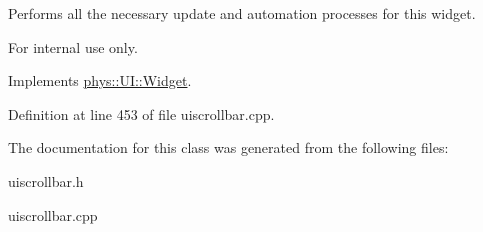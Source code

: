 Performs all the necessary update and automation processes for this widget. 

\begin{DoxyInternal}{For internal use only.}
\end{DoxyInternal}


Implements \hyperlink{classphys_1_1UI_1_1Widget_a1806425fcd684c2f0d50cd0ef4a6b0da}{phys::UI::Widget}.



Definition at line 453 of file uiscrollbar.cpp.



The documentation for this class was generated from the following files:\begin{DoxyCompactItemize}
\item 
uiscrollbar.h\item 
uiscrollbar.cpp\end{DoxyCompactItemize}
